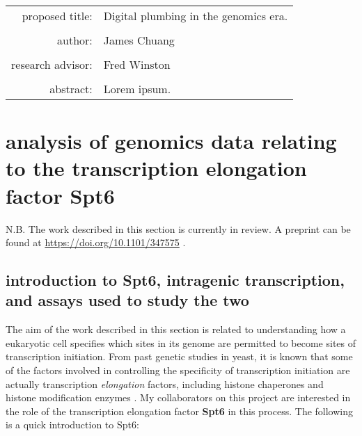 \documentclass[11pt, a4paper]{article}
\begin{document}
\begin{titlepage}
\begin{tabular}{ r l }
 proposed title:   & Digital plumbing in the genomics era. \\
 		   & \\
 author:	   & James Chuang \\
 		   & \\
 research advisor: & Fred Winston \\
 		   & \\
 abstract:	   & Lorem ipsum.
\end{tabular}
\end{titlepage}

\tableofcontents
\newpage

\section{analysis of genomics data relating to the transcription elongation factor Spt6}

N.B. The work described in this section is currently in review. A preprint can be found at \url{https://doi.org/10.1101/347575} \cite{doris2018}.

\subsection{introduction to Spt6, intragenic transcription, and assays used to study the two}

The aim of the work described in this section is related to understanding how a eukaryotic cell specifies which sites in its genome are permitted to become sites of transcription initiation. From past genetic studies in yeast, it is known that some of the factors involved in controlling the specificity of transcription initiation are actually transcription \textit{elongation} factors, including histone chaperones and histone modification enzymes \cite{kaplan2003, cheung2008, hennig2013}. My collaborators on this project are interested in the role of the transcription elongation factor \textbf{Spt6} in this process. The following is a quick introduction to Spt6:
\end{document}

